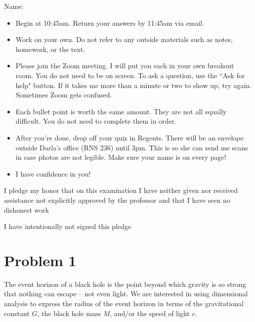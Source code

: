 \documentclass{article}
\newcommand{\purple}[1]{{\color{purple} #1}}
\begin{document}
Name: \makebox[2in]{\hrulefill\purple{SOLUTION}\hrulefill}

\vspace{0.5in}

\begin{itemize}
    \item Begin at 10:45am. Return your answers by 11:45am via email. 
    \item Work on your own. Do not refer to any outside materials such as notes, homework, or the text.
    \item Please join the Zoom meeting. I will put you each in your own breakout room. You do not need to be on screen. To ask a question, use the ``Ask for help" button. If it takes me more than a minute or two to show up, try again. Sometimes Zoom gets confused.
    \item Each bullet point is worth the same amount. They are not all equally difficult. You do not need to complete them in order.
    \item After you're done, drop off your quiz in Regents. There will be an envelope outside Darla's office (RNS 236) until 3pm. This is so she can send me scans in case photos are not legible. Make sure your name is on every page!
    \item I have confidence in you!
\end{itemize}

\vfill

I pledge my honor that on this examination I have neither given nor received assistance not explicitly approved by the professor and that I have seen no dishonest work \makebox[2in]{\hrulefill}

\vspace{0.5in}

I have intentionally not signed this pledge \makebox[2in]{\hrulefill}

\newpage

\section*{Problem 1}

The event horizon of a black hole is the point beyond which gravity is so strong that nothing can escape -- not even light. We are interested in using dimensional analysis to express the radius of the event horizon in terms of the gravitational constant $G$, the black hole mass $M$, and/or the speed of light $c$. 
\end{document}
